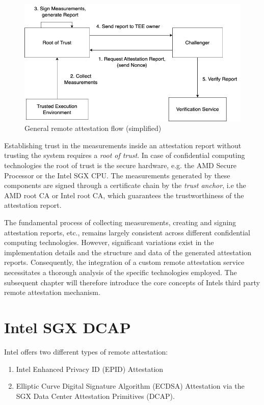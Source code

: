 \begin{figure}
	\begin{center} 
		\includegraphics[width=0.7\linewidth]{figures/general-attestation-flow.png}
	\end{center}
	\caption{General remote attestation flow (simplified)} 
	\label{general_attestation_flow}
\end{figure}

Establishing trust in the measurements inside an attestation report without trusting the system requires a \textit{root of trust}. In case of confidential computing technologies the root of trust is the secure hardware, e.g. the AMD Secure Processor or the Intel SGX CPU. The measurements generated by these components are signed through a certificate chain by the \textit{trust anchor}, i.e the AMD root CA or Intel root CA, which guarantees the trustworthiness of the attestation report. 

The fundamental process of collecting measurements, creating and signing attestation reports, etc., remains largely consistent across different confidential computing technologies. However, significant variations exist in the implementation details and the structure and data of the generated attestation reports. Consequently, the integration of a custom remote attestation service necessitates a thorough analysis of the specific technologies employed.
The subsequent chapter will therefore introduce the core concepts of Intels third party remote attestation mechanism. 

\section{Intel SGX DCAP}
Intel offers two different types of remote attestation: 

\begin{enumerate}
	\item Intel Enhanced Privacy ID (EPID) Attestation
	\item Elliptic Curve Digital Signature Algorithm (ECDSA) Attestation via the SGX Data Center Attestation Primitives (DCAP). 
\end{enumerate}

